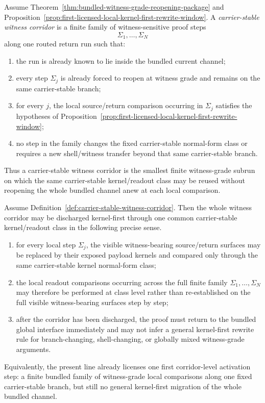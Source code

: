 \begin{definition}
\label{def:carrier-stable-witness-corridor}
Assume Theorem~\ref{thm:bundled-witness-grade-reopening-package} and Proposition~\ref{prop:first-licensed-local-kernel-first-rewrite-window}. A \emph{carrier-stable witness corridor} is a finite family of witness-sensitive proof steps
\[
\Sigma_1,\ldots,\Sigma_N
\]
along one routed return run such that:
\begin{enumerate}[leftmargin=2em,label=(\roman*)]
\item the run is already known to lie inside the bundled current channel;
\item every step $\Sigma_j$ is already forced to reopen at witness grade and remains on the same carrier-stable branch;
\item for every $j$, the local source/return comparison occurring in $\Sigma_j$ satisfies the hypotheses of Proposition~\ref{prop:first-licensed-local-kernel-first-rewrite-window};
\item no step in the family changes the fixed carrier-stable normal-form class or requires a new shell/witness transfer beyond that same carrier-stable branch.
\end{enumerate}
Thus a carrier-stable witness corridor is the smallest finite witness-grade subrun on which the same carrier-stable kernel/readout class may be reused without reopening the whole bundled channel anew at each local comparison.
\end{definition}

\begin{lemma}
\label{lem:first-corridor-level-kernel-first-activation}
Assume Definition~\ref{def:carrier-stable-witness-corridor}. Then the whole witness corridor may be discharged kernel-first through one common carrier-stable kernel/readout class in the following precise sense.
\begin{enumerate}[leftmargin=2em,label=(\roman*)]
\item for every local step $\Sigma_j$, the visible witness-bearing source/return surfaces may be replaced by their exposed payload kernels and compared only through the same carrier-stable kernel normal-form class;
\item the local readout comparisons occurring across the full finite family $\Sigma_1,\ldots,\Sigma_N$ may therefore be performed at class level rather than re-established on the full visible witness-bearing surfaces step by step;
\item after the corridor has been discharged, the proof must return to the bundled global interface immediately and may not infer a general kernel-first rewrite rule for branch-changing, shell-changing, or globally mixed witness-grade arguments.
\end{enumerate}
Equivalently, the present line already licenses one first corridor-level activation step: a finite bundled family of witness-grade local comparisons along one fixed carrier-stable branch, but still no general kernel-first migration of the whole bundled channel.
\end{lemma}

